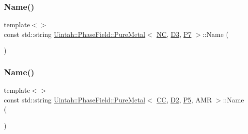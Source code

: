 \subsubsection{\texorpdfstring{Name()}{Name()}\hspace{0.1cm}{\footnotesize\ttfamily [4/8]}}
{\footnotesize\ttfamily template$<$$>$ \\
const std\+::string \hyperlink{classUintah_1_1PhaseField_1_1PureMetal}{Uintah\+::\+Phase\+Field\+::\+Pure\+Metal}$<$ \hyperlink{namespaceUintah_1_1PhaseField_a33d355affda78a83f45755ba8388cedda77924170fe82bfd58b74ca3e44139718}{NC}, \hyperlink{namespaceUintah_1_1PhaseField_a12bfc68444894dffdf0cb8d9cf0cc76aa72fd61934c7ca788c49ad90629f76e78}{D3}, \hyperlink{namespaceUintah_1_1PhaseField_a24d833a720598df1020f5cc2e75f8702a099a5b9a00f5644bb917fdec6afd8768}{P7} $>$\+::Name (\begin{DoxyParamCaption}{ }\end{DoxyParamCaption})}

\mbox{\label{classUintah_1_1PhaseField_1_1PureMetal_ab5e48a2ac5013c3ac87f497418ab19c9}} 
\subsubsection{\texorpdfstring{Name()}{Name()}\hspace{0.1cm}{\footnotesize\ttfamily [5/8]}}
{\footnotesize\ttfamily template$<$$>$ \\
const std\+::string \hyperlink{classUintah_1_1PhaseField_1_1PureMetal}{Uintah\+::\+Phase\+Field\+::\+Pure\+Metal}$<$ \hyperlink{namespaceUintah_1_1PhaseField_a33d355affda78a83f45755ba8388cedda22303704507d024d1d6508ed9859a85a}{CC}, \hyperlink{namespaceUintah_1_1PhaseField_a12bfc68444894dffdf0cb8d9cf0cc76aa1a451dae278b0103a94105c8776e9a67}{D2}, \hyperlink{namespaceUintah_1_1PhaseField_a24d833a720598df1020f5cc2e75f8702a218e7fca21085b602c79158a04bc83a0}{P5}, A\+MR $>$\+::Name (\begin{DoxyParamCaption}{ }\end{DoxyParamCaption})}

\mbox{\label{classUintah_1_1PhaseField_1_1PureMetal_a7bf6a9bfad4bded3c99b94ce721c71c0}} 
